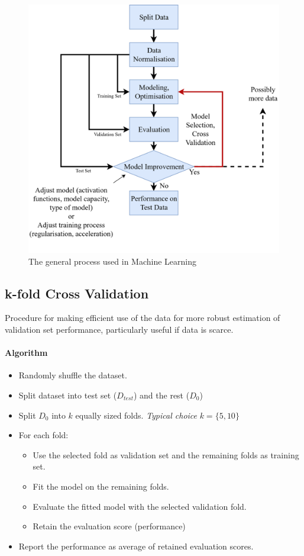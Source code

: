 \documentclass[11pt]{article}
\begin{document}
\begin{figure}[H]
	\centering
	\includegraphics[width=0.6\linewidth]{img/standard_process_machine_learning}
	\caption{The general process used in Machine Learning}
	\label{fig:standardprocessmachinelearning}
\end{figure}

\subsection{k-fold Cross Validation}
Procedure for making efficient use of the data for more robust estimation of validation set performance, particularly useful if data is scarce.

\paragraph{Algorithm}
\begin{itemize}
	\item Randomly shuffle the dataset.
	\item Split dataset into test set ($D_{test}$) and the rest ($D_0$)
	\item Split $D_0$ into $k$ equally sized folds. \emph{Typical choice} $k = \{5,10\}$
	\item For each fold:
	\begin{itemize}
		\item Use the selected fold as validation set and the remaining folds as training set.
		\item Fit the model on the remaining folds.
		\item Evaluate the fitted model with the selected validation fold.
		\item Retain the evaluation score (performance)
	\end{itemize}
	\item Report the performance as average of retained evaluation scores.
\end{itemize}
\end{document}
